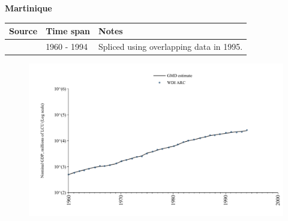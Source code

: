 \documentclass[12pt,a4paper,landscape]{article}
\begin{document}
\begin{adjustbox}{max totalsize={\paperwidth}{\paperheight},center}
\begin{minipage}[t][\textheight][t]{\textwidth}
\vspace*{0.5cm}
{}
\begin{center}
{\Large\bfseries Martinique}
\end{center}
\vspace{0.5cm}
\begin{table}[H]
\centering
\small
\begin{tabular}{|l|l|l|}
\hline
\textbf{Source} & \textbf{Time span} & \textbf{Notes} \\
\hline
\rowcolor{white}\cite{WDI_ARC}& 1960 - 1994 &Spliced using overlapping data in 1995.\\
\hline
\end{tabular}
\end{table}
\begin{figure}[H]
\centering
\includegraphics[width=\textwidth,height=0.6\textheight,keepaspectratio]{graphs/MTQ_nGDP.pdf}
\end{figure}
\end{minipage}
\end{adjustbox}
\end{document}
